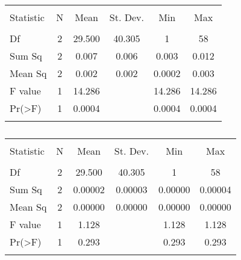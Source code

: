 
\begin{table}[!htbp] \centering 
  \caption{} 
  \label{} 
\begin{tabular}{@{\extracolsep{5pt}}lccccc} 
\\[-1.8ex]\hline 
\hline \\[-1.8ex] 
Statistic & \multicolumn{1}{c}{N} & \multicolumn{1}{c}{Mean} & \multicolumn{1}{c}{St. Dev.} & \multicolumn{1}{c}{Min} & \multicolumn{1}{c}{Max} \\ 
\hline \\[-1.8ex] 
Df & 2 & 29.500 & 40.305 & 1 & 58 \\ 
Sum Sq & 2 & 0.007 & 0.006 & 0.003 & 0.012 \\ 
Mean Sq & 2 & 0.002 & 0.002 & 0.0002 & 0.003 \\ 
F value & 1 & 14.286 &  & 14.286 & 14.286 \\ 
Pr(\textgreater F) & 1 & 0.0004 &  & 0.0004 & 0.0004 \\ 
\hline \\[-1.8ex] 
\end{tabular} 
\end{table} 

\begin{table}[!htbp] \centering 
  \caption{} 
  \label{} 
\begin{tabular}{@{\extracolsep{5pt}}lccccc} 
\\[-1.8ex]\hline 
\hline \\[-1.8ex] 
Statistic & \multicolumn{1}{c}{N} & \multicolumn{1}{c}{Mean} & \multicolumn{1}{c}{St. Dev.} & \multicolumn{1}{c}{Min} & \multicolumn{1}{c}{Max} \\ 
\hline \\[-1.8ex] 
Df & 2 & 29.500 & 40.305 & 1 & 58 \\ 
Sum Sq & 2 & 0.00002 & 0.00003 & 0.00000 & 0.00004 \\ 
Mean Sq & 2 & 0.00000 & 0.00000 & 0.00000 & 0.00000 \\ 
F value & 1 & 1.128 &  & 1.128 & 1.128 \\ 
Pr(\textgreater F) & 1 & 0.293 &  & 0.293 & 0.293 \\ 
\hline \\[-1.8ex] 
\end{tabular} 
\end{table} 

